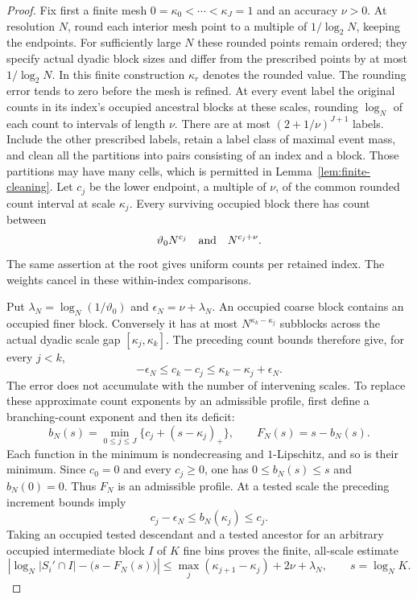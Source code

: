 \begin{proof}
Fix first a finite mesh
$0=\kappa_0<\cdots<\kappa_J=1$ and an accuracy $\nu>0$.
At resolution $N$, round each interior mesh point to a multiple of
$1/\log_2N$, keeping the endpoints. For sufficiently large $N$ these
rounded points remain ordered; they specify actual dyadic block sizes and
differ from the prescribed points by at most $1/\log_2N$. In this finite construction
$\kappa_r$ denotes the rounded value. The rounding error tends to zero
before the mesh is refined.
At every event label the original counts in its index's occupied ancestral
blocks at these scales, rounding $\log_N$ of each count to intervals of
length $\nu$.  There are at most $(2+1/\nu)^{J+1}$ labels.  Include the
other prescribed labels, retain a label class of maximal event mass, and
clean all the partitions into pairs consisting of an index and a block.
Those partitions may have many cells, which is permitted in
Lemma~\ref{lem:finite-cleaning}. Let $c_j$ be the lower endpoint, a
multiple of $\nu$, of the common rounded count interval at scale
$\kappa_j$. Every surviving occupied block there has count
between
\[
 \vartheta_0N^{c_j}
 \quad\hbox{and}\quad N^{c_j+\nu}.
\]
The same assertion at the root gives uniform counts per retained index.
The weights cancel in these within-index comparisons.

Put $\lambda_N=\log_N(1/\vartheta_0)$ and
$\epsilon_N=\nu+\lambda_N$.  An occupied coarse block contains an
occupied finer block.  Conversely it has at most $N^{\kappa_k-\kappa_j}$
subblocks across the actual dyadic scale gap $[\kappa_j,\kappa_k]$.
The preceding count bounds therefore give, for every $j<k$,
\[
 -\epsilon_N\le c_k-c_j
 \le\kappa_k-\kappa_j+\epsilon_N.
\]
The error does not accumulate with the number of intervening scales.
To replace these approximate count exponents by an admissible profile,
first define a branching-count exponent and then its deficit:
\[
 b_N(s)=\min_{0\le j\le J}\{c_j+(s-\kappa_j)_+\},
 \qquad F_N(s)=s-b_N(s).
\]
Each function in the minimum is nondecreasing and $1$-Lipschitz, and so is
their minimum.  Since $c_0=0$ and every $c_j\ge0$, one has
$0\le b_N(s)\le s$ and $b_N(0)=0$.  Thus $F_N$ is an admissible profile.
At a tested scale the preceding increment bounds imply
\[
 c_j-\epsilon_N\le b_N(\kappa_j)\le c_j.
\]
Taking an occupied tested descendant and a tested ancestor for an arbitrary
occupied intermediate block $I$ of $K$ fine bins proves the finite,
all-scale estimate
\begin{equation}\label{eq:finite-profile-error}
 \left|\log_N|S_i'\cap I|-
 \bigl(s-F_N(s)\bigr)\right|
 \le \max_j(\kappa_{j+1}-\kappa_j)+2\nu+\lambda_N,
 \qquad s=\log_N K.
\end{equation}


\end{proof}
